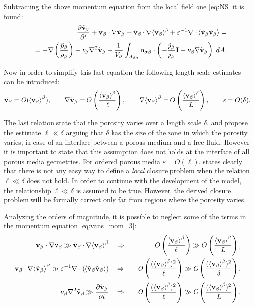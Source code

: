 \noindent Subtracting the above momentum equation from the local field one \eqref{eq:NS} it is found:
\begin{eqnarray}
&&  \dfrac{\partial \tilde{\textbf{v}}_{\beta}}{\partial t} + \textbf{v}_{\beta} \cdot \nabla \tilde{\textbf{v}}_{\beta} + \tilde{\textbf{v}}_{\beta} \cdot \nabla {\left< \textbf{v}_{\beta}\right>}^{\beta} + \varepsilon^{-1}\nabla \cdot  {\left< \tilde{\textbf{v}}_{\beta}\tilde{\textbf{v}}_{\beta}\right>} = \nonumber \\
&&= -\nabla \left(\dfrac{\tilde{p}_{\beta}}{\rho_{\beta}}\right) + \nu_{\beta} \nabla^2 \tilde{\textbf{v}}_{\beta}  - \dfrac{1}{V_\beta} \displaystyle\int_{A_{\beta \sigma}} \mathbf{n}_{\sigma \beta}  \cdot \left(-\dfrac{\tilde{p}_{\beta}}{\rho_{\beta}} \mathbf{I}  + \nu_{\beta} \nabla \tilde{\textbf{v}}_{\beta} \right)  \;dA.
\label{eq:vans_mom_3}
\end{eqnarray}

Now in order to simplify this last equation the following length-scale estimates can be introduced:
$$ \tilde{\textbf{v}}_{\beta} = O({\left< \textbf{v}_{\beta} \right>}^{\beta}), \qquad \nabla\tilde{\textbf{v}}_{\beta} = O \left(\dfrac{{\left< \textbf{v}_{\beta} \right>}^{\beta}}{\ell} \right), \qquad  \nabla {\left< \textbf{v}_{\beta}\right>}^{\beta} = O\left(\dfrac{{\left< \textbf{v}_{\beta} \right>}^{\beta}}{L}\right), \qquad \varepsilon = O(\delta). $$

The last relation state that the porosity varies over a length scale $\delta$. \citet{valdes2013velocity} and \citet{ochoa1995momentum} propose the estimate $\ell \ll \delta$ arguing that $\delta$ has the size of the zone in which the porosity varies, in case of an interface between a porous medium and a free fluid.
However it is important to state that this assumption does not holds at the interface of all porous media geometries. For ordered porous media $\varepsilon = O(\ell)$.
\citet{whitaker1996forchheimer} states clearly that there is not any easy way to define a \textit{local} closure problem when the relation $\ell \ll \delta$ does not hold.
In order to continue with the development of the model, the relationship $\ell \ll \delta$ is assumed to be true. However, the derived closure problem will be formally correct only far from regions where the porosity varies.

Analyzing the orders of magnitude, it is possible to neglect some of the terms in the momentum equation \eqref{eq:vans_mom_3}:
\begin{eqnarray}
\textbf{v}_{\beta} \cdot \nabla \tilde{\textbf{v}}_{\beta} \gg \tilde{\textbf{v}}_{\beta} \cdot \nabla {\left< \textbf{v}_{\beta}\right>}^{\beta} \quad &\Rightarrow&  \quad O\left(\dfrac{{\left< \textbf{v}_{\beta} \right>}^{\beta}}{\ell}\right) \gg O\left(\dfrac{{\left< \textbf{v}_{\beta} \right>}^{\beta}}{L} \right), \\
\textbf{v}_{\beta} \cdot \nabla {\left< \tilde{\textbf{v}}_{\beta}\right>}^{\beta} \gg  \varepsilon^{-1} \nabla \cdot \left({\left< \tilde{\textbf{v}}_{\beta} \tilde{\textbf{v}}_{\beta} \right>}\right)  \quad &\Rightarrow& \quad O\left(\dfrac{({\left< \textbf{v}_{\beta} \right>}^{\beta})^2}{\ell}\right) \gg O\left(\dfrac{({\left< \textbf{v}_{\beta} \right>}^{\beta})^2}{\delta} \right), \label{eq:sbs}\\
\nu_{\beta} \nabla^2 \tilde{\textbf{v}}_{\beta} \gg  \dfrac{\partial \tilde{\textbf{v}}_{\beta}}{\partial t}  \quad &\Rightarrow&  \quad O\left(\dfrac{({\left< \textbf{v}_{\beta} \right>}^{\beta})^2}{\ell}\right) \gg O\left(\dfrac{({\left< \textbf{v}_{\beta} \right>}^{\beta})^2}{L} \right).
\end{eqnarray}

